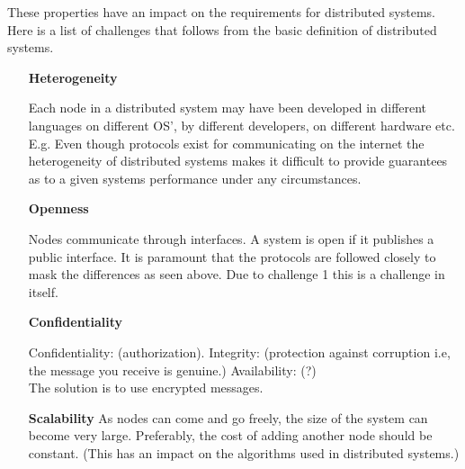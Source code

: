 These properties have an impact on the requirements for distributed systems. Here is a list of challenges that follows from the basic definition of distributed systems.

\begin{enumerate}

\item [\textbf{Heterogeneity}]

Each node in a distributed system may have been developed in different languages on different OS', by different developers, on different hardware etc.\\

E.g. Even though protocols exist for communicating on the internet the heterogeneity of distributed systems makes it difficult to provide guarantees as to a given systems performance under any circumstances.  \\

\item[\textbf{Openness}]


Nodes communicate through interfaces. A system is open if it publishes a public interface. It is paramount that the protocols are followed closely to mask the differences as seen above. Due to challenge 1 this is a challenge in itself.\\


\item[\textbf{Confidentiality}]

Confidentiality: (authorization). Integrity: (protection against corruption i.e, the message you receive is genuine.) Availability: (?)\\

The solution is to use encrypted messages.\\

\item[\textbf{Scalability}]
As nodes can come and go freely, the size of the system can become very large. Preferably, the cost of adding another node should be constant. (This has an impact on the algorithms used in distributed systems.)\\


\end{enumerate}
